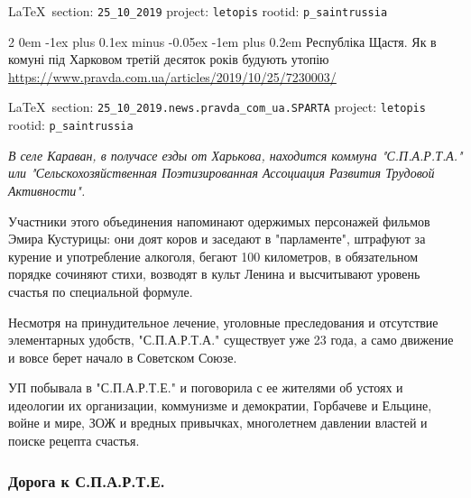 \documentclass[a4paper,11pt]{extreport}
\makeatletter
\renewcommand\subsection{%
  \clearpage
    \@startsection{subsection}%
    {2}%
    {0em}%
    {-1ex plus 0.1ex minus -0.05ex}%
    {-1em plus 0.2em}%
    {\scshape\bfseries\Large}%
}
\makeatother
\begin{document}
\vspace{0.5cm}
 {\ifDEBUG\small\LaTeX~section: \verb|25_10_2019| project: \verb|letopis| rootid: \verb|p_saintrussia| \fi}
\vspace{0.5cm}

 
 
\subsection{Республіка Щастя. Як в комуні під Харковом третій десяток років будують утопію}
\label{sec:25_10_2019.news.pravda_com_ua.SPARTA}
\url{https://www.pravda.com.ua/articles/2019/10/25/7230003/}
  
\vspace{0.5cm}
 {\ifDEBUG\small\LaTeX~section: \verb|25_10_2019.news.pravda_com_ua.SPARTA| project: \verb|letopis| rootid: \verb|p_saintrussia| \fi}
\vspace{0.5cm}

{\em
В селе Караван, в получасе езды от Харькова, находится коммуна "С.П.А.Р.Т.А."
или "Сельскохозяйственная Поэтизированная Ассоциация Развития Трудовой
Активности". 

Участники этого объединения напоминают одержимых персонажей фильмов Эмира
Кустурицы: они доят коров и заседают в "парламенте", штрафуют за курение и
употребление алкоголя, бегают 100 километров, в обязательном порядке сочиняют
стихи, возводят в культ Ленина и высчитывают уровень счастья по специальной
формуле. 

Несмотря на принудительное лечение, уголовные преследования и отсутствие
элементарных удобств, "С.П.А.Р.Т.А." существует уже 23 года, а само движение и
вовсе берет начало в Советском Союзе.

УП побывала в "С.П.А.Р.Т.Е." и поговорила с ее жителями об устоях и идеологии
их организации, коммунизме и демократии, Горбачеве и Ельцине, войне и мире, ЗОЖ
и вредных привычках, многолетнем давлении властей и поиске рецепта счастья.
}

\subsubsection{Дорога к С.П.А.Р.Т.Е.}
\end{document}
